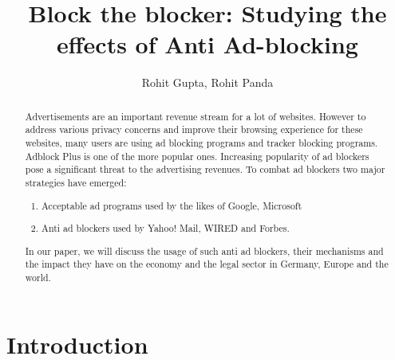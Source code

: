 \documentclass[runningheads,a4paper]{llncs}
\begin{document}
\mainmatter  %

\title{Block the blocker: Studying the effects of Anti Ad-blocking}


\author{Rohit Gupta, Rohit Panda}

%
%

\maketitle


\begin{abstract}
Advertisements are an important revenue stream for a lot of websites. However to address various privacy concerns and improve their browsing experience for these websites, many users are using ad blocking programs and tracker blocking programs.\cite{Garimella2017} Adblock Plus is one of the more popular ones. Increasing popularity of ad blockers pose a significant threat to the advertising revenues.  To combat ad blockers two major strategies have emerged:
\begin{enumerate}
\item Acceptable ad programs used by the likes of Google, Microsoft
\item Anti ad blockers used by Yahoo! Mail, WIRED and Forbes.
\end{enumerate}


In our paper, we will discuss the usage of such anti ad blockers, their mechanisms and the impact they have on the economy and the legal sector in Germany, Europe and the world.

\end{abstract}


\section{Introduction}
\label{section:intro}
\end{document}
